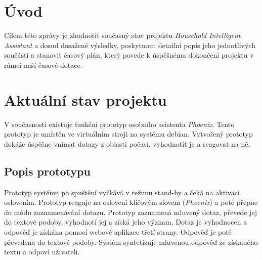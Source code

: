 \documentclass[12pt,a4paper]{article}
\begin{document}
\newpage
\pagestyle{plain}     %
\setcounter{page}{1}
\addtolength{\voffset}{-3cm}
\addtolength{\headheight}{2cm}

\pagestyle{fancy}
\lfoot{}
\cfoot{\thepage}
\rfoot{}
\renewcommand{\headrulewidth}{0.4pt}

\section*{Úvod}
Cílem této zprávy je zhodnotit současný stav projektu \textit{Household Intelligent Assistant} a dosud dosažené výsledky, poskytnout detailní popis jeho jednotlivých součástí a stanovit časový plán, který povede k úspěšnému dokončení projektu v rámci naší časové dotace.
\section*{Aktuální stav projektu}
V současnosti existuje funkční prototyp osobního asistenta \textit{Phoenix}. Tento prototyp je umístěn ve virtuálním stroji na systému debian. Vytvořený prototyp dokáže úspěšne vnímat dotazy z oblasti počasí, vyhodnotit je a reagovat na ně. 

\subsection*{Popis prototypu}
Prototyp systému po spuštění vyčkává v režimu stand-by a čeká na aktivaci oslovením. Prototyp reaguje na oslovení klíčovým slovem (\textit{Phoenix}) a poté přepne do módu zaznamenávání dotazu. Prototyp zaznamená mluvený dotaz, převede jej do textové podoby, vyhodnotí jej a získá jeho význam. Dotaz je vyhodnocen a odpověď je získána pomocí webové aplikace třetí strany. Odpověď je poté převedena do textové podoby. Systém syntetizuje mluvenou odpověď ze získaného textu a odpoví uživateli.
\end{document}
